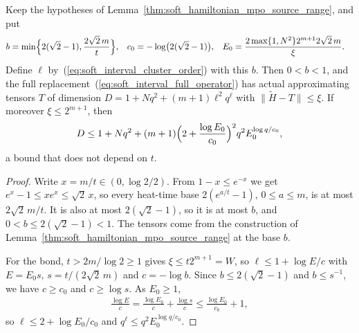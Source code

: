 \begin{lemma}
    \label{thm:soft_hamiltonian_mpo_scale_free_bond}
    \leanok

    Keep the hypotheses of
    Lemma~\ref{thm:soft_hamiltonian_mpo_source_range}, and put
    \begin{align}
        b   & =\min\Bigl\{2(\sqrt2-1),\frac{2\sqrt2\,m}{t}\Bigr\}, &
        c_0 & =-\log\bigl(2(\sqrt2-1)\bigr),                       &
        E_0 & =\frac{2\max\{1,N^2\}2^{m+1}2\sqrt2\,m}{\xi}.
        \label{eq:soft_interval_scale_free_constants}
    \end{align}
    Define $\ell$ by~(\ref{eq:soft_interval_cluster_order}) with this $b$.
    Then $0<b<1$, and the full replacement~(\ref{eq:soft_interval_full_operator})
    has actual approximating tensors $T$ of dimension
    $D=1+Nq^2+(m+1)\ell^2q^\ell$ with $\|\widetilde H-T\|\leq\xi$. If
    moreover $\xi\leq2^{m+1}$, then
    \begin{align}
        D\leq1+Nq^2+(m+1)\Bigl(2+\frac{\log E_0}{c_0}\Bigr)^2q^2E_0^{\log q/c_0},
        \label{eq:soft_interval_scale_free_bond}
    \end{align}
    a bound that does not depend on $t$.
\end{lemma}
\begin{proof}\leanok
    Write $x=m/t\in(0,\log2/2)$. From $1-x\leq e^{-x}$ we get
    $e^x-1\leq xe^x\leq\sqrt2\,x$, so every heat-time base
    $2(e^{a/t}-1)$, $0\leq a\leq m$, is at most $2\sqrt2\,m/t$. It is also at most
    $2(\sqrt2-1)$, so it is at most $b$, and $0<b\leq2(\sqrt2-1)<1$. The
    tensors come from the construction of
    Lemma~\ref{thm:soft_hamiltonian_mpo_source_range} at the base $b$.

    For the bond, $t>2m/\log2\geq1$ gives $\xi\leq t2^{m+1}=W$, so
    $\ell\leq1+\log E/c$ with $E=E_0s$, $s=t/(2\sqrt2\,m)$ and $c=-\log b$.
    Since $b\leq2(\sqrt2-1)$ and $b\leq s^{-1}$, we have $c\geq c_0$ and
    $c\geq\log s$. As $E_0\geq1$,
    \begin{align}
        \frac{\log E}{c}=\frac{\log E_0}{c}+\frac{\log s}{c}
        \leq\frac{\log E_0}{c_0}+1,
    \end{align}
    so $\ell\leq2+\log E_0/c_0$ and
    $q^\ell\leq q^2E_0^{\log q/c_0}$.
\end{proof}

